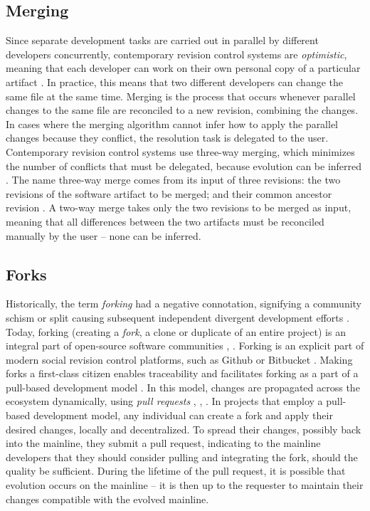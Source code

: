 \subsection{Merging}
Since separate development tasks are carried out in parallel by different developers concurrently, contemporary revision control systems are \textit{optimistic}, meaning that each developer can work on their own personal copy of a particular artifact \cite{mens2002}. In practice, this means that two different developers can change the same file at the same time. Merging is the process that occurs whenever parallel changes to the same file are reconciled to a new revision, combining the changes. In cases where the merging algorithm cannot infer how to apply the parallel changes because they conflict, the resolution task is delegated to the user. Contemporary revision control systems use three-way merging, which minimizes the number of conflicts that must be delegated, because evolution can be inferred \cite{mens2002}. The name three-way merge comes from its input of three revisions: the two revisions of the software artifact to be merged; and their common ancestor revision \cite{mens2002}. A two-way merge takes only the two revisions to be merged as input, meaning that all differences between the two artifacts must be reconciled manually by the user -- none can be inferred.

\subsection{Forks}
Historically, the term \textit{forking} had a negative connotation, signifying a community schism or split causing subsequent independent divergent development efforts \cite{stanciulescu2015}. Today, forking (creating a \textit{fork}, a clone or duplicate of an entire project) is an integral part of open-source software communities \cite{gousios2014pullreq}, \cite{stanciulescu2015}.
Forking is an explicit part of modern social revision control platforms, such as Github or Bitbucket \cite{gousios2015}. Making forks a first-class citizen enables traceability and facilitates forking as a part of a pull-based development model \cite{stanciulescu2015}. In this model, changes are propagated across the ecosystem dynamically, using \textit{pull requests} \cite{gousios2014pullreq}, \cite{gousios2015}, \cite{stanciulescu2015}. In projects that employ a pull-based development model, any individual can create a fork and apply their desired changes, locally and decentralized. To spread their changes, possibly back into the mainline, they submit a pull request, indicating to the mainline developers that they should consider pulling and integrating the fork, should the quality be sufficient. During the lifetime of the pull request, it is possible that evolution occurs on the mainline -- it is then up to the requester to maintain their changes compatible with the evolved mainline.

